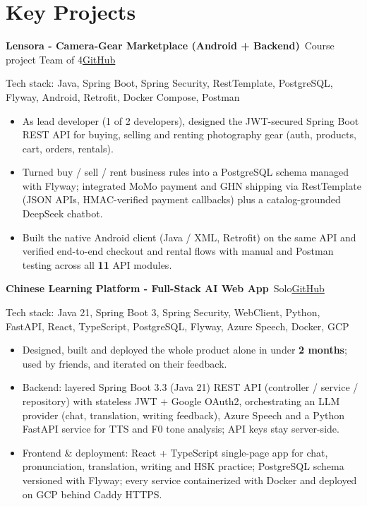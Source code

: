 \documentclass[10pt, a4paper]{article}
\newcommand{\project}[3]{\textbf{#1}\,{\color{MutedText}\textbar{} #2}\hfill\href{#3}{GitHub}\par}
\newcommand{\techstack}[1]{{\color{MutedText}Tech stack: #1}\par}
\begin{document}
\section{Key Projects}
\project{Lensora - Camera-Gear Marketplace (Android + Backend)}{Course project \textbullet{} Team of 4}{https://github.com/minhphuong150505/Lensora}
\techstack{Java, Spring Boot, Spring Security, RestTemplate, PostgreSQL, Flyway, Android, Retrofit, Docker Compose, Postman}
\begin{itemize}
  \item As lead developer (1 of 2 developers), designed the JWT-secured Spring Boot REST API for buying, selling and renting photography gear (auth, products, cart, orders, rentals).
  \item Turned buy / sell / rent business rules into a PostgreSQL schema managed with Flyway; integrated MoMo payment and GHN shipping via RestTemplate (JSON APIs, HMAC-verified payment callbacks) plus a catalog-grounded DeepSeek chatbot.
  \item Built the native Android client (Java / XML, Retrofit) on the same API and verified end-to-end checkout and rental flows with manual and Postman testing across all \textbf{11} API modules.
\end{itemize}
\vspace{2pt}
\project{Chinese Learning Platform - Full-Stack AI Web App}{Solo}{https://github.com/minhphuong150505/Web_Chinese_Learning-}
\techstack{Java 21, Spring Boot 3, Spring Security, WebClient, Python, FastAPI, React, TypeScript, PostgreSQL, Flyway, Azure Speech, Docker, GCP}
\begin{itemize}
  \item Designed, built and deployed the whole product alone in under \textbf{2 months}; used by friends, and iterated on their feedback.
  \item Backend: layered Spring Boot 3.3 (Java 21) REST API (controller / service / repository) with stateless JWT + Google OAuth2, orchestrating an LLM provider (chat, translation, writing feedback), Azure Speech and a Python FastAPI service for TTS and F0 tone analysis; API keys stay server-side.
  \item Frontend \& deployment: React + TypeScript single-page app for chat, pronunciation, translation, writing and HSK practice; PostgreSQL schema versioned with Flyway; every service containerized with Docker and deployed on GCP behind Caddy HTTPS.
\end{itemize}
\vspace{2pt}
\end{document}

